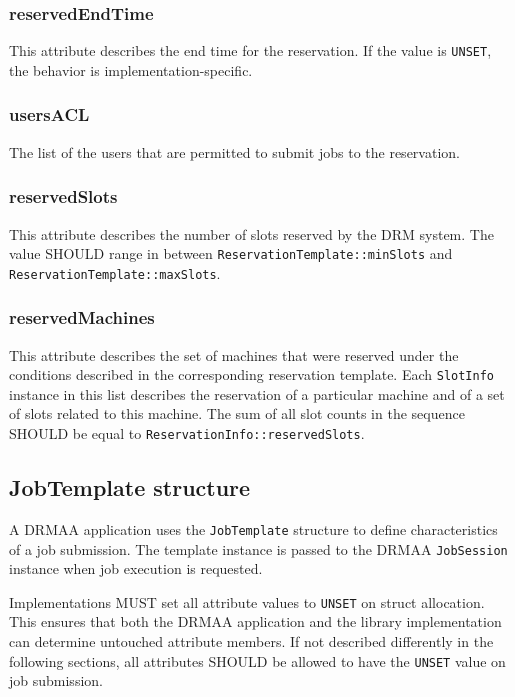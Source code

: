 \documentclass{article}
\newcommand{\h}[1]{\lstinline|#1|}
\newcommand{\rat}[1]{}
\begin{document}
\subsubsection{reservedEndTime}

This attribute describes the end time for the reservation. If the value is \h{UNSET}, the behavior is implementation-specific.

\rat{Mai 18th 2011 conf call rejected to treat UNSET as unrestricted end time (i.e. ``plus infinity'') here.}

\subsubsection{usersACL}

The list of the users that are permitted to submit jobs to the reservation.

\subsubsection{reservedSlots}

This attribute describes the number of slots  reserved by the DRM system.
The value SHOULD range in between \h{ReservationTemplate::minSlots} and \h{ReservationTemplate::maxSlots}.

\subsubsection{reservedMachines}

This attribute describes the set of machines that were reserved under the conditions described in the corresponding reservation template. Each \h{SlotInfo} instance in this list describes the reservation of a particular machine and of a set of slots related to this machine. The sum of all slot counts in the sequence SHOULD be equal to \h{ReservationInfo::reservedSlots}.

\subsection{JobTemplate structure}
\label{sec:jobtemplate}

A DRMAA application uses the \h{JobTemplate} structure to define characteristics of a job submission. The template instance is passed to the DRMAA \h{JobSession} instance when job execution is requested.



Implementations MUST set all attribute values to \h{UNSET} on struct allocation. This ensures that both the DRMAA application and the library implementation can determine untouched attribute members. If not described differently in the following sections, all attributes SHOULD be allowed to have the \h{UNSET} value on job submission.
\end{document}

